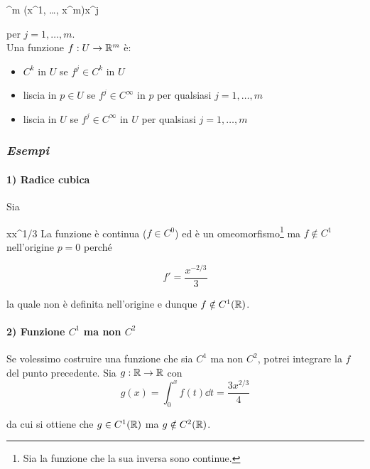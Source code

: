 	{\R^{m}}{\R}
	{(x^{1}, \dots, x^{m})}{x^{j}}
	
per $ j = 1, \dots, m $. \\
Una funzione $ f : U \to \mathbb{R}^{m} $ è:

\begin{itemize}
	\item $ C^{k} $ in $ U $ se $ f^{j} \in C^{k} $ in $ U $
	
	\item liscia in $ p \in U $ se $ f^{j} \in C^{\infty} $ in $ p $ per qualsiasi $ j = 1, \dots, m $
	
	\item liscia in $ U $ se $ f^{j} \in C^{\infty} $ in $ U $ per qualsiasi $ j = 1, \dots, m $
\end{itemize}

\subsubsection{\textit{Esempi}}

\paragraph{1) Radice cubica}

Sia

	{\R}{\R}
	{x}{x^{1/3}}
La funzione è continua ($ f \in C^{0} $) ed è un omeomorfismo\footnote{%
	Sia la funzione che la sua inversa sono continue.%
} ma $ f \notin C^{1} $ nell'origine $ p = 0 $ perché

\begin{equation}
	f' = \dfrac{x^{-2/3}}{3}
\end{equation}

la quale non è definita nell'origine e dunque $ f \notin C^{1} (\mathbb{R}) $.

\paragraph{2) Funzione $ C^{1} $ ma non $ C^{2} $}

Se volessimo costruire una funzione che sia $ C^{1} $ ma non $ C^{2} $, potrei integrare la $ f $ del punto precedente. Sia $ g : \mathbb{R} \to \mathbb{R} $ con
\begin{equation}
	g (x) = \int_{0}^{x} f (t) \dd{t} = \dfrac{3 x^{2/3}}{4}
\end{equation}

da cui si ottiene che $ g \in C^{1} (\mathbb{R}) $ ma $ g \notin C^{2} (\mathbb{R}) $.

